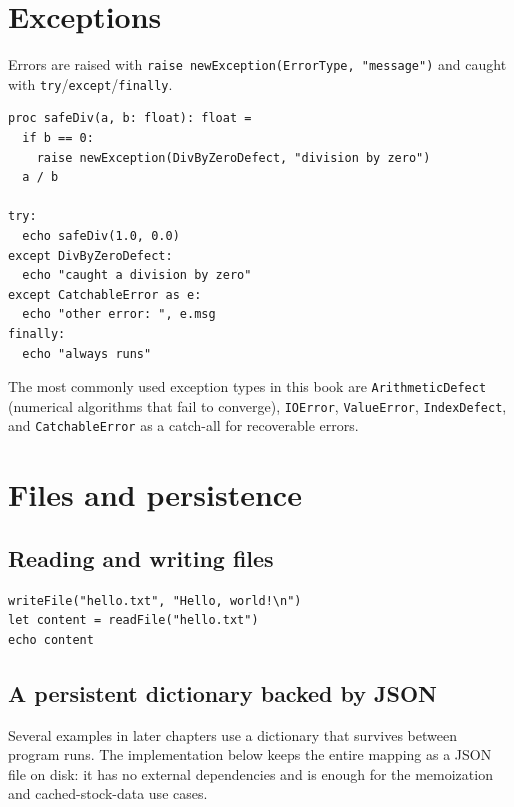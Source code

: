 \documentclass[justified, sixbynine]{tufte-book}
\def\ft{\small\tt}
\theoremstyle{plain}%
\newtheorem * {corollary}{Corollary}
\theoremstyle{definition}
\theoremstyle{remark}
\newtheorem * {remark}{Remark}
\newtheorem * {note}{Note}
\begin{document}
\begin{fullwidth}
\goodbreak\section{Exceptions}


Errors are raised with {\ft raise newException(ErrorType, "message")} and caught with {\ft try}/{\ft except}/{\ft finally}.

\begin{lstlisting}
proc safeDiv(a, b: float): float =
  if b == 0:
    raise newException(DivByZeroDefect, "division by zero")
  a / b

try:
  echo safeDiv(1.0, 0.0)
except DivByZeroDefect:
  echo "caught a division by zero"
except CatchableError as e:
  echo "other error: ", e.msg
finally:
  echo "always runs"
\end{lstlisting}

The most commonly used exception types in this book are {\ft ArithmeticDefect} (numerical algorithms that fail to converge), {\ft IOError}, {\ft ValueError}, {\ft IndexDefect}, and {\ft CatchableError} as a catch-all for recoverable errors.

\goodbreak\section{Files and persistence}

\goodbreak\subsection{Reading and writing files}

\begin{lstlisting}
writeFile("hello.txt", "Hello, world!\n")
let content = readFile("hello.txt")
echo content
\end{lstlisting}

\goodbreak\subsection{A persistent dictionary backed by JSON}

Several examples in later chapters use a dictionary that survives between program runs. The implementation below keeps the entire mapping as a JSON file on disk: it has no external dependencies and is enough for the memoization and cached-stock-data use cases.



\end{fullwidth}
\end{document}
